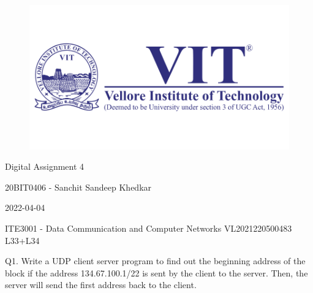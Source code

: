 \documentclass[12pt]{article}
\begin{document}
\begin{titlepage}
\NoBgThispage
   \begin{center}
        \begin{figure}[h] %
        \centering
        \includegraphics[width=15cm]{1583124354phpJTtnK5.png}
        \end{figure}

        \Huge{Digital Assignment 4}

        \vspace{0.5cm}
        \LARGE{20BIT0406 - Sanchit Sandeep Khedkar}
       
        \vspace{2.5 cm}
        \Large{2022-04-04}
        
        \vspace{0.25 cm}
        \Large{ITE3001 - Data Communication and Computer Networks}
        \large{VL2021220500483 L33+L34}
       

       \vfill
    \end{center}
\end{titlepage}
\newpage

\setcounter{page}{2}
\pagestyle{fancy}
\fancyhf{}
\rhead{\thepage}

Q1.  
Write a UDP client server program to find out the beginning address of the block if the address 134.67.100.1/22 is sent by the client to the server. Then, the server will send the first address back to the client.
\end{document}
